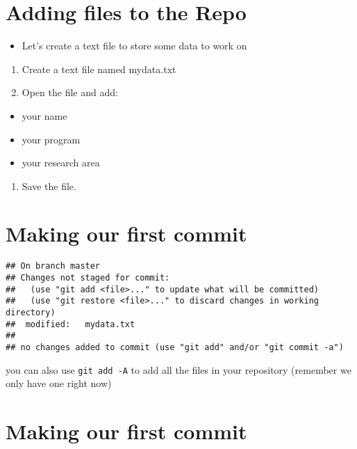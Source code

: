 \documentclass[]{article}
\providecommand{\tightlist}{%
  \setlength{\itemsep}{0pt}\setlength{\parskip}{0pt}}
\begin{document}
\section{Adding files to the Repo}\label{adding-files-to-the-repo}

\begin{itemize}
\tightlist
\item
  Let's create a text file to store some data to work on
\end{itemize}

\begin{enumerate}
\def\labelenumi{\arabic{enumi}.}
\item
  Create a text file named mydata.txt
\item
  Open the file and add:
\end{enumerate}

\begin{itemize}
\tightlist
\item
  your name
\item
  your program
\item
  your research area
\end{itemize}

\begin{enumerate}
\def\labelenumi{\arabic{enumi}.}
\setcounter{enumi}{2}
\tightlist
\item
  Save the file.
\end{enumerate}

\section{Making our first commit}\label{making-our-first-commit}

\begin{verbatim}
## On branch master
## Changes not staged for commit:
##   (use "git add <file>..." to update what will be committed)
##   (use "git restore <file>..." to discard changes in working directory)
##  modified:   mydata.txt
## 
## no changes added to commit (use "git add" and/or "git commit -a")
\end{verbatim}

you can also use \texttt{git\ add\ -A} to add all the files in your
repository (remember we only have one right now)

\section{Making our first commit}\label{making-our-first-commit-1}
\end{document}

